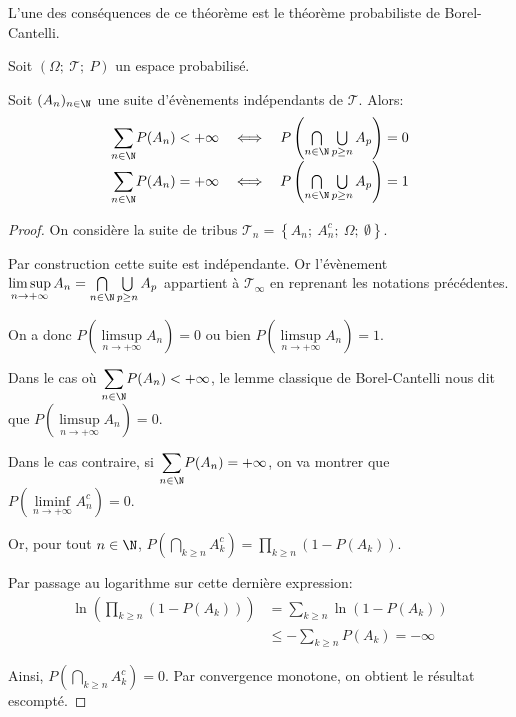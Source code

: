 L'une des conséquences de ce théorème est le théorème probabiliste de Borel-Cantelli.

\begin{theo}
\label{borel_cantelli_fort}
Soit $(\Omega;~\mathcal{T};~P)$ un espace probabilisé.

Soit $(A_n)_{n \in \N}$ une suite d'évènements indépendants de $\mathcal{T}$. Alors:
\[
\begin{array}{lcl}
\displaystyle{\sum \limits_{n \in \N}} P(A_n) < +\infty & \iff & P\left(\bigcap \limits_{n \in \N} \bigcup \limits_{p \geq n} A_p\right) = 0\\
\displaystyle{\sum \limits_{n \in \N}} P(A_n) = +\infty & \iff & P\left(\bigcap \limits_{n \in \N} \bigcup \limits_{p \geq n} A_p\right) = 1
\end{array}
\]
\end{theo}


\begin{proof}
On considère la suite de tribus $\mathcal{T}_n = \left \{ A_n;~A_n^c;~\Omega;~\emptyset\right  \}$.

Par construction cette suite est indépendante. Or l'évènement $\limsup \limits_{n \to +\infty} A_n  = \bigcap \limits_{n \in \N} \bigcup \limits_{p \geq n} A_p$ appartient à $\mathcal{T}_{\infty}$ en reprenant les notations précédentes.

On a donc $P\left(\limsup \limits_{n \to +\infty} A_n\right)=0$ ou bien $P\left(\limsup \limits_{n \to +\infty} A_n\right)=1$.

Dans le cas où $\displaystyle{\sum \limits_{n \in \N}} P(A_n) < +\infty$, le lemme classique de Borel-Cantelli nous dit que $P\left(\limsup \limits_{n \to +\infty} A_n\right)=0$.

Dans le cas contraire, si $\displaystyle{\sum \limits_{n \in \N}} P(A_n) = +\infty$, on va montrer que $P\left(\liminf \limits_{n \to +\infty} A_n^c\right)=0$.

Or, pour tout $n \in \N$, $P\left(\bigcap \limits_{k \geq n} A_k^c\right) = \displaystyle{\prod \limits_{k \geq n}} \left(1-P(A_k)\right)$.

Par passage au logarithme sur cette dernière expression:
\begin{align*}
\ln\left(\displaystyle{\prod \limits_{k \geq n}} \left(1-P(A_k)\right)\right) & = \displaystyle{\sum \limits_{k \geq n}} \ln\left(1-P(A_k)\right) \\
 & \leq -\displaystyle{\sum \limits_{k \geq n}} P(A_k) = -\infty
\end{align*}

Ainsi, $P\left(\bigcap \limits_{k \geq n} A_k^c\right) = 0$. Par convergence monotone, on obtient le résultat escompté.
\end{proof}

